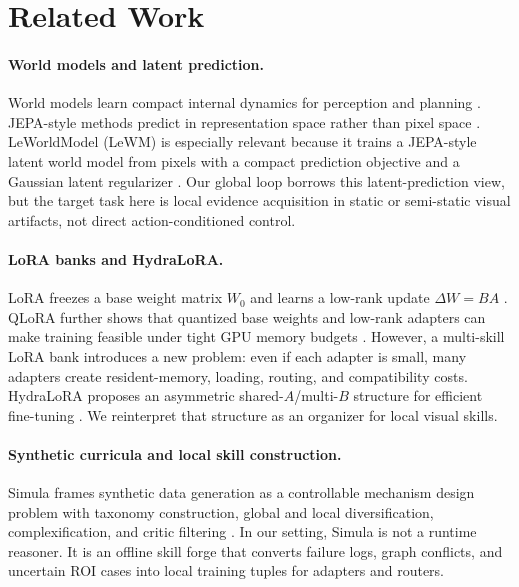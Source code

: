 \documentclass[11pt]{article}
\begin{document}
\section{Related Work}

\paragraph{World models and latent prediction.}
World models learn compact internal dynamics for perception and planning \citep{ha2018worldmodels,hafner2023dreamerv3}.
JEPA-style methods predict in representation space rather than pixel space \citep{assran2023ijepa,bardes2024vjepa}.
LeWorldModel (LeWM) is especially relevant because it trains a JEPA-style latent world model from pixels with a compact prediction objective and a Gaussian latent regularizer \citep{maes2026leworldmodel}.
Our global loop borrows this latent-prediction view, but the target task here is local evidence acquisition in static or semi-static visual artifacts, not direct action-conditioned control.

\paragraph{LoRA banks and HydraLoRA.}
LoRA freezes a base weight matrix $W_0$ and learns a low-rank update $\Delta W = BA$ \citep{hu2021lora}.
QLoRA further shows that quantized base weights and low-rank adapters can make training feasible under tight GPU memory budgets \citep{dettmers2023qlora}.
However, a multi-skill LoRA bank introduces a new problem: even if each adapter is small, many adapters create resident-memory, loading, routing, and compatibility costs.
HydraLoRA proposes an asymmetric shared-$A$/multi-$B$ structure for efficient fine-tuning \citep{tian2024hydralora}.
We reinterpret that structure as an organizer for local visual skills.

\paragraph{Synthetic curricula and local skill construction.}
Simula frames synthetic data generation as a controllable mechanism design problem with taxonomy construction, global and local diversification, complexification, and critic filtering \citep{davidson2026simula}.
In our setting, Simula is not a runtime reasoner.
It is an offline skill forge that converts failure logs, graph conflicts, and uncertain ROI cases into local training tuples for adapters and routers.
\end{document}
